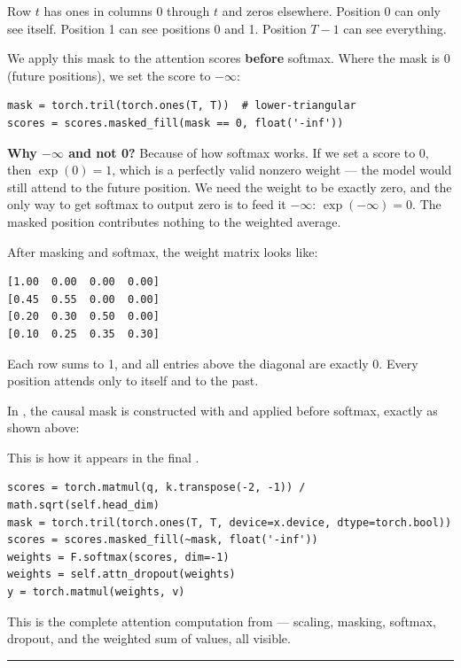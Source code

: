 Row $t$ has ones in columns 0 through $t$ and zeros elsewhere. Position 0 can only see itself. Position 1 can see positions 0 and 1. Position $T-1$ can see everything.

We apply this mask to the attention scores \textbf{before} softmax. Where the mask is 0 (future positions), we set the score to $-\infty$:

\demotag
\begin{lstlisting}
mask = torch.tril(torch.ones(T, T))  # lower-triangular
scores = scores.masked_fill(mask == 0, float('-inf'))
\end{lstlisting}

\textbf{Why $-\infty$ and not 0?} Because of how softmax works. If we set a score to 0, then $\exp(0) = 1$, which is a perfectly valid nonzero weight --- the model would still attend to the future position. We need the weight to be exactly zero, and the only way to get softmax to output zero is to feed it $-\infty$: $\exp(-\infty) = 0$. The masked position contributes nothing to the weighted average.

After masking and softmax, the weight matrix looks like:

\outputtag
\begin{lstlisting}[language={}]
[1.00  0.00  0.00  0.00]
[0.45  0.55  0.00  0.00]
[0.20  0.30  0.50  0.00]
[0.10  0.25  0.35  0.30]
\end{lstlisting}

Each row sums to 1, and all entries above the diagonal are exactly 0. Every position attends only to itself and to the past.

In , the causal mask is constructed with  and applied before softmax, exactly as shown above:

This is how it appears in the final .

\concepttag
\begin{lstlisting}
scores = torch.matmul(q, k.transpose(-2, -1)) / math.sqrt(self.head_dim)
mask = torch.tril(torch.ones(T, T, device=x.device, dtype=torch.bool))
scores = scores.masked_fill(~mask, float('-inf'))
weights = F.softmax(scores, dim=-1)
weights = self.attn_dropout(weights)
y = torch.matmul(weights, v)
\end{lstlisting}

This is the complete attention computation from  --- scaling, masking, softmax, dropout, and the weighted sum of values, all visible.

\bigskip\hrule\bigskip


